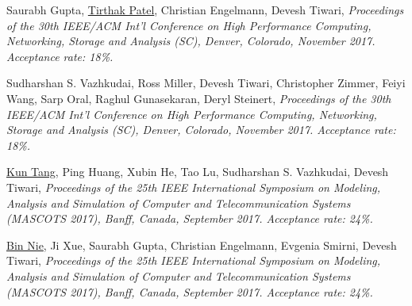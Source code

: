 

{\textnormal{\newline Saurabh Gupta, \underline{Tirthak Patel}, Christian Engelmann, Devesh Tiwari,}} {\textit{Proceedings of the 30th IEEE/ACM Int'l Conference on High Performance Computing, Networking, Storage and Analysis (SC), Denver, Colorado, November 2017. Acceptance rate: 18\%.\newline}}{}{}{} %

{\textnormal{\newline Sudharshan S. Vazhkudai, Ross Miller, Devesh Tiwari, Christopher Zimmer, Feiyi Wang, Sarp Oral, Raghul Gunasekaran, Deryl Steinert,}} {\textit{Proceedings of the 30th IEEE/ACM Int'l Conference on High Performance Computing, Networking, Storage and Analysis (SC), Denver, Colorado, November 2017. Acceptance rate: 18\%.\newline}}{}{}{} %

{\textnormal{\newline \underline{Kun Tang}, Ping Huang, Xubin He, Tao Lu, Sudharshan S. Vazhkudai, Devesh Tiwari,}} {\textit{Proceedings of the 25th IEEE International Symposium on Modeling, Analysis and Simulation of Computer and Telecommunication Systems (MASCOTS 2017), Banff, Canada, September 2017. Acceptance rate: 24\%.\newline}}{}{}{} %

{\textnormal{\newline \underline{Bin Nie}, Ji Xue, Saurabh Gupta, Christian Engelmann, Evgenia Smirni, Devesh Tiwari,}} {\textit{Proceedings of the 25th IEEE International Symposium on Modeling, Analysis and Simulation of Computer and Telecommunication Systems (MASCOTS 2017), Banff, Canada, September 2017. Acceptance rate: 24\%.\newline}}{}{}{} %

